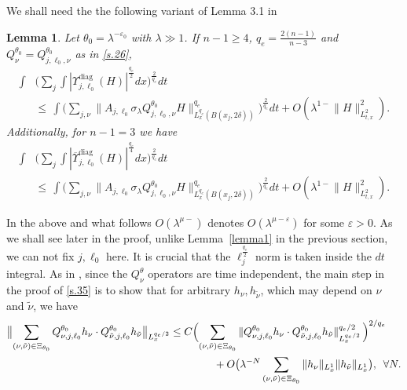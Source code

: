 \documentclass[10pt]{amsart}
\newtheorem{lemma}[theorem]{Lemma}
\newcommand{\la}{\lambda}
\newcommand{\e}{\varepsilon}
\newcommand{\1}{{\bf 1}}
\newcommand{\diag}{\Upsilon^{\text{diag}}}
\newcommand{\diagbar}{\overline\Upsilon^{\text{diag}}}
\begin{document}
We shall need the the following variant of  Lemma 3.1 in \cite{HSst} 
\begin{lemma}\label{lemmas1}  Let $\theta_0=\la^{-\e_0}$ with $\la \gg 1$.
If $n-1\ge4$, $q_e=\frac{2(n-1)}{n-3}$ and $Q^{\theta_0}_\nu=Q^{\theta_0}_{j,\ell_0,\nu}$ as in \eqref{s.26}, 
\begin{equation}\label{s.35}
\begin{aligned}
    \int &\big(\sum_j \int|\diag_{j,\ell_0}(H)|^{\frac{q_e}{2}}dx\big)^{\frac{2}{q_e}} dt \\
&\le  \,\int \big(\sum_{j,\nu}\bigl\| A_{j,\ell_0}\sigma_\la Q^{\theta_0}_{j,\ell_0,\nu} H\bigr\|^{q_e}_{L^{q_e}_x(B(x_j,2\delta))}\big)^{\frac{2}{q_e}}dt+O(\la^{1-}\|H\|^2_{L^2_{t,x}}).
\end{aligned}
\end{equation}
Additionally, for $n-1=3$ we have 
\begin{equation}\label{s.35a}
\begin{aligned}
    \int &\big(\sum_j \int|\diagbar_{j,\ell_0}(H)|^{\frac{q_e}{4}}dx\big)^{\frac{2}{q_e}} dt \\
&\le  \,\int \big(\sum_{j,\nu}\bigl\| A_{j,\ell_0}\sigma_\la Q^{\theta_0}_{j,\ell_0,\nu} H\bigr\|^{q_e}_{L^{q_e}_x(B(x_j,2\delta))}\big)^{\frac{2}{q_e}}dt+O(\la^{1-}\|H\|^2_{L^2_{t,x}}).
\end{aligned}
\end{equation}
\end{lemma}
In the above and what follows $O(\la^{\mu-})$ denotes $O(\la^{\mu-\e})$ for some $\e>0$. As we shall see later in the proof, unlike Lemma~\ref{lemma1} in the previous section, we can not fix $j,\ell_0$ here. It is crucial that the $\ell^{\frac{q_e}{2}}_j$ norm is taken inside the $dt$ integral.  As in \cite{HSst}, since the $Q_\nu^\theta$ operators are time independent, 
the main step in the proof of \eqref{s.35} is to show that 
for arbitrary $h_{\nu}, h_{\tilde \nu}$, which may depend on $\nu$ and $\tilde\nu$, we have 
\begin{equation}\label{s.35b}
    \begin{aligned}
        \bigl\|\sum_{(\nu,\tilde \nu)\in \Xi_{\theta_0}}
Q_{\nu,j,\ell_0}^{\theta_0} h_{ \nu}\cdot 
Q_{\tilde \nu,j,\ell_0}^{\theta_0} h_{\tilde \nu}\bigr\|
_{L^{q_e/2}_x} \le C &
\Bigl(
\sum_{(\nu,\tilde \nu)\in \Xi_{\theta_0}}
\| Q_{\nu,j,\ell_0}^{\theta_0}  h_{ \nu}\cdot 
Q_{\tilde \nu,j,\ell_0}^{\theta_0}  h_{\tilde \nu}\|_{L^{q_e/2}_{x}}^{q_e/2}\,
\Bigr)^{2/q_e} \\
&\qquad
+O\big(\la^{-N}\sum_{(\nu,\tilde \nu)\in \Xi_{\theta_0}}\|h_{\nu}\|_{L^1_x}\|h_{\tilde \nu}\|_{L^1_x}\big),\,\,\,\forall N.
    \end{aligned}
\end{equation}
\end{document}
